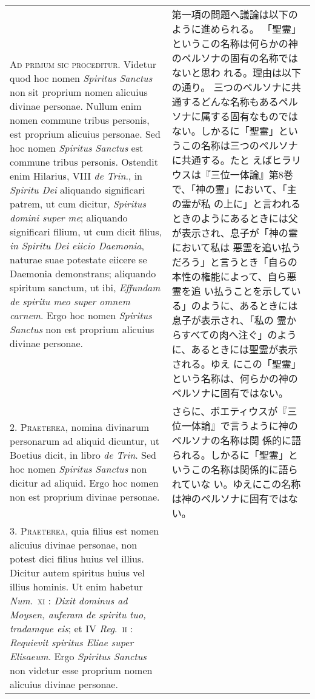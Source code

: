 \documentclass[10pt]{jsarticle} %
\begin{document}
\begin{longtable}{p{21em}p{21em}}

{\scshape Ad primum sic proceditur}. Videtur quod hoc nomen {\itshape Spiritus Sanctus} non
sit proprium nomen alicuius divinae personae. Nullum enim nomen
commune tribus personis, est proprium alicuius personae. Sed hoc nomen
{\itshape Spiritus Sanctus} est commune tribus personis. Ostendit enim Hilarius,
VIII {\itshape de Trin}., in {\itshape Spiritu Dei} aliquando significari patrem, ut cum
dicitur, {\itshape Spiritus domini super me}; aliquando significari filium, ut
cum dicit filius, {\itshape in Spiritu Dei eiicio Daemonia}, naturae suae
potestate eiicere se Daemonia demonstrans; aliquando spiritum sanctum,
ut ibi, {\itshape Effundam de spiritu meo super omnem carnem}. Ergo hoc nomen
{\itshape Spiritus Sanctus} non est proprium alicuius divinae personae.

&

第一項の問題へ議論は以下のように進められる。
「聖霊」というこの名称は何らかの神のペルソナの固有の名称ではないと思わ
 れる。理由は以下の通り。
三つのペルソナに共通するどんな名称もあるペルソナに属する固有なものでは
 ない。しかるに「聖霊」というこの名称は三つのペルソナに共通する。たと
 えばヒラリウスは『三位一体論』第8巻で、「神の霊」において、「主の霊が私
 の上に」と言われるときのようにあるときには父が表示され、息子が「神の霊において私は
 悪霊を追い払うだろう」と言うとき「自らの本性の権能によって、自ら悪霊を追
 い払うことを示している」のように、あるときには息子が表示され、「私の
 霊からすべての肉へ注ぐ」のように、あるときには聖霊が表示される。ゆえ
 にこの「聖霊」という名称は、何らかの神のペルソナに固有ではない。


\\



2. {\scshape Praeterea}, nomina divinarum personarum ad aliquid dicuntur, ut Boetius
dicit, in libro {\itshape de Trin}. Sed hoc nomen {\itshape Spiritus Sanctus} non dicitur ad
aliquid. Ergo hoc nomen non est proprium divinae personae.

&

さらに、ボエティウスが『三位一体論』で言うように神のペルソナの名称は関
 係的に語られる。しかるに「聖霊」というこの名称は関係的に語られていな
 い。ゆえにこの名称は神のペルソナに固有ではない。

\\



3. {\scshape Praeterea}, quia filius est nomen alicuius divinae personae, non potest
dici filius huius vel illius. Dicitur autem spiritus huius vel illius
hominis. Ut enim habetur {\itshape Num}.~{\scshape xi} : {\itshape Dixit dominus ad Moysen, auferam de
spiritu tuo, tradamque eis}; et IV {\itshape Reg}.~{\scshape ii} : {\itshape Requievit spiritus Eliae
super Elisaeum}. Ergo {\itshape Spiritus Sanctus} non videtur esse proprium nomen
alicuius divinae personae.


\end{longtable}
\end{document}
